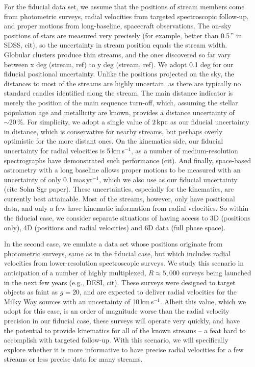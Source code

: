 \documentclass[modern]{aastex61}
\begin{document}
For the fiducial data set, we assume that the positions of stream members come from photometric surveys, radial velocities from targeted spectroscopic follow-up, and proper motions from long-baseline, spacecraft observations.
The on-sky positions of stars are measured very precisely (for example, better than 0.5\,'' in SDSS, cit), so the uncertainty in stream position equals the stream width.
Globular clusters produce thin streams, and the ones discovered so far vary between x deg (stream, ref) to y deg (stream, ref).
We adopt 0.1 deg for our fiducial positional uncertainty.
Unlike the positions projected on the sky, the distances to most of the streams are highly uncertain, as there are typically no standard candles identified along the stream.
The main distance indicator is merely the position of the main sequence turn-off, which, assuming the stellar population age and metallicity are known, provides a distance uncertainty of $\sim20\,\%$.
For simplicity, we adopt a single value of $2\,\rm kpc$ as our fiducial uncertainty in distance, which is conservative for nearby streams, but perhaps overly optimistic for the more distant ones.
On the kinematics side, our fiducial uncertainty for radial velocities is 5\,km\,s$^{-1}$, as a number of medium-resolution spectrographs have demonstrated such performance (cit).
And finally, space-based astrometry with a long baseline allows proper motions to be measured with an uncertainty of only 0.1\,mas\,yr$^{-1}$, which we also use as our fiducial uncertainty (cite Sohn Sgr paper).
These uncertainties, especially for the kinematics, are currently best attainable.
Most of the streams, however, only have positional data, and only a few have kinematic information from radial velocities.
So within the fiducial case, we consider separate situations of having access to 3D (positions only), 4D (positions and radial velocities) and 6D data (full phase space).

In the second case, we emulate a data set whose positions originate from photometric surveys, same as in the fiducial case, but which includes radial velocities from lower-resolution spectroscopic surveys.
We study this scenario in anticipation of a number of highly multiplexed, $R\approx5,000$ surveys being launched in the next few years (e.g., DESI, cit).
These surveys were designed to target objects as faint as $g=20$, and are expected to deliver radial velocities for the Milky Way sources with an uncertainty of 10\,km\,s$^{-1}$.
Albeit this value, which we adopt for this case, is an order of magnitude worse than the radial velocity precision in our fiducial case, these surveys will operate very quickly, and have the potential to provide kinematics for all of the known streams -- a feat hard to accomplish with targeted follow-up.
With this scenario, we will specifically explore whether it is more informative to have precise radial velocities for a few streams or less precise data for many streams.
\end{document}
